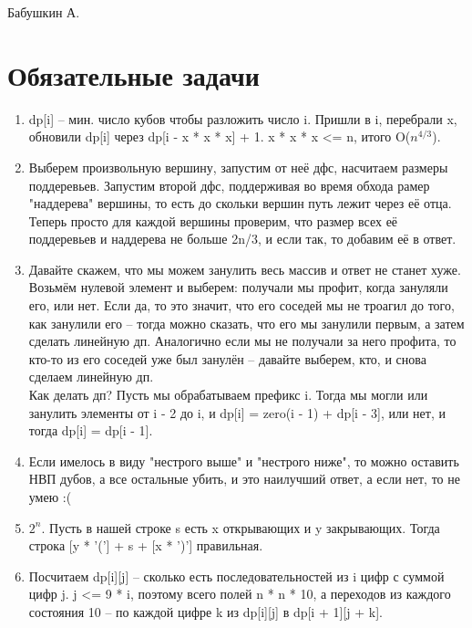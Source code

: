 \documentclass[12pt]{article}
\begin{document}
\def\t{\texttt}

Бабушкин А.

\section{Обязательные задачи}

\begin{enumerate}
	\setlength{\parskip}{0pt} 
	\setlength{\itemsep}{0pt} 
	\item dp[i] -- мин. число кубов чтобы разложить число i. Пришли в i, перебрали x, обновили dp[i] через 
    dp[i - x * x * x] + 1. x * x * x <= n, итого O($n^{4 / 3}$). \\
    \item Выберем произвольную вершину, запустим от неё дфс, насчитаем размеры поддеревьев. Запустим второй дфс, 
	поддерживая во время обхода рамер "наддерева" вершины, то есть до скольки вершин путь лежит через её отца. 
	Теперь просто для каждой вершины проверим, что размер всех её поддеревьев и наддерева не больше 2n/3, и если так, 
	то добавим её в ответ. \\
	\item Давайте скажем, что мы можем занулить весь массив и ответ не станет хуже. Возьмём нулевой элемент и выберем: 
	получали мы профит, когда зануляли его, или нет. Если да, то это значит, что его соседей мы не троагил до того, 
	как занулили его -- тогда можно сказать, что его мы занулили первым, а затем сделать линейную дп. 
	Аналогично если мы не получали за него профита, то кто-то из его соседей уже был занулён -- давайте выберем, кто, 
	и снова сделаем линейную дп. \\
	Как делать дп? Пусть мы обрабатываем префикс i. Тогда мы могли или занулить элементы от i - 2 до i, и dp[i] = 
	zero(i - 1) + dp[i - 3], или нет, и тогда dp[i] = dp[i - 1]. \\
	\item Если имелось в виду "нестрого выше" и "нестрого ниже", то можно оставить НВП дубов, а все остальные убить, и 
	это наилучший ответ, а если нет, то не умею :( \\
	\item $2^n$. Пусть в нашей строке s есть x открывающих и y закрывающих. Тогда строка [y * '('] + s + [x * ')'] 
	правильная. \\
	\item Посчитаем dp[i][j] -- сколько есть последовательностей из i цифр с суммой цифр j. j <= 9 * i, поэтому всего 
	полей n * n * 10, а переходов из каждого состояния 10 -- по каждой цифре k из dp[i][j] в dp[i + 1][j + k]. \\

\end{enumerate}
\end{document}
